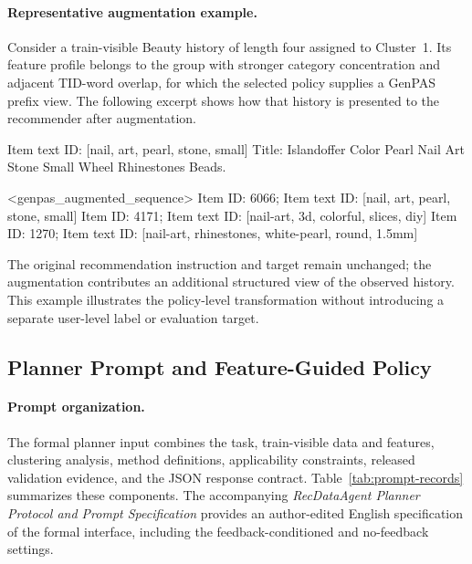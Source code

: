 \paragraph{Representative augmentation example.}
Consider a train-visible Beauty history of length four assigned to Cluster~1. Its feature profile belongs to the group with stronger category concentration and adjacent TID-word overlap, for which the selected policy supplies a GenPAS prefix view. The following excerpt shows how that history is presented to the recommender after augmentation.

\begingroup\footnotesize
\begin{promptblock}[samepage=true]
Item text ID: [nail, art, pearl, stone, small]
Title: Islandoffer Color Pearl Nail Art Stone Small Wheel
Rhinestones Beads.

<genpas_augmented_sequence>
Item ID: 6066; Item text ID: [nail, art, pearl, stone, small]
Item ID: 4171; Item text ID: [nail-art, 3d, colorful,
slices, diy]
Item ID: 1270; Item text ID: [nail-art, rhinestones,
white-pearl, round, 1.5mm]
\end{promptblock}
\endgroup

The original recommendation instruction and target remain unchanged; the augmentation contributes an additional structured view of the observed history. This example illustrates the policy-level transformation without introducing a separate user-level label or evaluation target.

\subsection{Planner Prompt and Feature-Guided Policy}

\paragraph{Prompt organization.}
The formal planner input combines the task, train-visible data and features, clustering analysis, method definitions, applicability constraints, released validation evidence, and the JSON response contract. Table~\ref{tab:prompt-records} summarizes these components. The accompanying \emph{RecDataAgent Planner Protocol and Prompt Specification} provides an author-edited English specification of the formal interface, including the feedback-conditioned and no-feedback settings.


